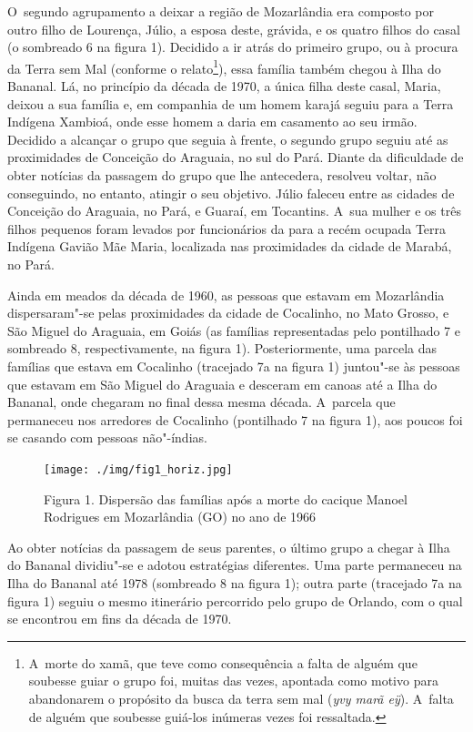 O~segundo agrupamento a deixar a região de Mozarlândia era composto por
outro filho de Lourença, Júlio, a esposa deste, grávida, e os quatro
filhos do casal (o sombreado 6 na figura 1). Decidido a ir atrás do
primeiro grupo, ou à procura da Terra sem Mal (conforme o
relato\footnote{A~morte do xamã, que teve como consequência a falta de
alguém que soubesse guiar o grupo foi, muitas das vezes, apontada como
motivo para abandonarem o propósito da busca da terra sem mal (\emph{yvy marã
eÿ}). A~falta de alguém que soubesse guiá-los inúmeras vezes foi
ressaltada.}), essa família também chegou à Ilha do Bananal. Lá, no
princípio da década de 1970, a única filha deste casal, Maria, deixou a
sua família e, em companhia de um homem karajá seguiu para a Terra
Indígena Xambioá, onde esse homem a daria em casamento ao seu irmão.
Decidido a alcançar o grupo que seguia à frente, o segundo grupo seguiu
até as proximidades de Conceição do Araguaia, no sul do Pará. Diante da
dificuldade de obter notícias da passagem do grupo que lhe antecedera,
resolveu voltar, não conseguindo, no entanto, atingir o seu objetivo.
Júlio faleceu entre as cidades de Conceição do Araguaia, no Pará, e
Guaraí, em Tocantins. A~sua mulher e os três filhos pequenos foram
levados por funcionários da  para a recém ocupada Terra Indígena
Gavião Mãe Maria, localizada nas proximidades da cidade de Marabá, no
Pará. 

Ainda em meados da década de 1960, as pessoas que estavam em Mozarlândia
dispersaram"-se pelas proximidades da cidade de Cocalinho, no Mato
Grosso, e São Miguel do Araguaia, em Goiás (as famílias representadas
pelo pontilhado 7 e sombreado 8, respectivamente, na figura 1).
Posteriormente, uma parcela das famílias que estava em Cocalinho
(tracejado 7a na figura 1) juntou"-se às pessoas que estavam em São
Miguel do Araguaia e desceram em canoas até a Ilha do Bananal, onde
chegaram no final dessa mesma década. A~parcela que permaneceu nos
arredores de Cocalinho (pontilhado 7 na figura 1), aos poucos foi se
casando com pessoas não"-índias. 


\begin{figure}
 \centering
\texttt{[image: ./img/fig1\_horiz.jpg]}	
 \hfill
 \caption{Figura 1. Dispersão das famílias após a morte do cacique Manoel Rodrigues em Mozarlândia (GO) no ano de 1966}
\end{figure} 



Ao obter notícias da passagem de seus parentes, o último grupo a chegar
à Ilha do Bananal dividiu"-se e adotou estratégias diferentes. Uma parte
permaneceu na Ilha do Bananal até 1978 (sombreado 8 na figura 1); outra
parte (tracejado 7a na figura 1) seguiu o mesmo itinerário percorrido
pelo grupo de Orlando, com o qual se encontrou em fins da década de
1970.

